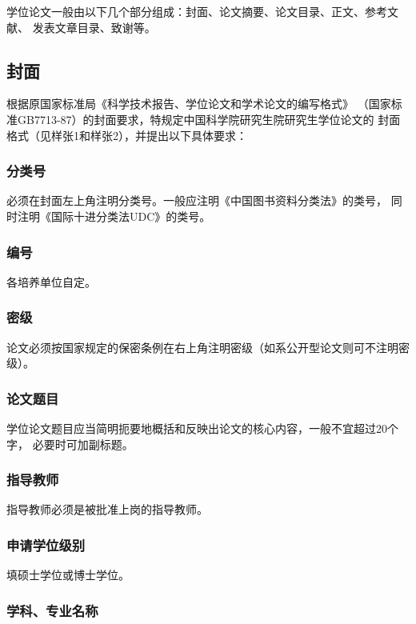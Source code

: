 学位论文一般由以下几个部分组成：封面、论文摘要、论文目录、正文、参考文献、
发表文章目录、致谢等。

\subsection{封面}

根据原国家标准局《科学技术报告、学位论文和学术论文的编写格式》
（国家标准GB7713-87）的封面要求，特规定中国科学院研究生院研究生学位论文的
封面格式（见样张1和样张2），并提出以下具体要求：

\subsubsection{分类号}

必须在封面左上角注明分类号。一般应注明《中国图书资料分类法》的类号，
同时注明《国际十进分类法UDC》的类号。

\subsubsection{编号}

各培养单位自定。

\subsubsection{密级}

论文必须按国家规定的保密条例在右上角注明密级（如系公开型论文则可不注明密级）。

\subsubsection{论文题目}

学位论文题目应当简明扼要地概括和反映出论文的核心内容，一般不宜超过20个字，
必要时可加副标题。

\subsubsection{指导教师}

指导教师必须是被批准上岗的指导教师。

\subsubsection{申请学位级别}

填硕士学位或博士学位。

\subsubsection{学科、专业名称}

